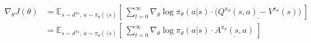 \begin{align}
\nabla_\theta J(\theta)
&= \mathbb{E}_{s \sim d^{\pi_\theta},\ a \sim \pi_\theta(\cdot|s)} \left\lbrack\ \sum_{t=0}^{\infty} \nabla_\theta\log \pi_\theta(a|s)\cdot \underline{\Big( Q^{\pi_\theta}(s, a) - V^{\pi_\theta}(s) \Big)} \ \right\rbrack \\
&= \mathbb{E}_{s \sim d^{\pi_\theta},\ a \sim \pi_\theta(\cdot|s)} \left\lbrack\ \sum_{t=0}^{\infty} \nabla_\theta\log \pi_\theta(a|s)\cdot \underline{A^{\pi_\theta}(s, a)} \ \right\rbrack
\end{align}
